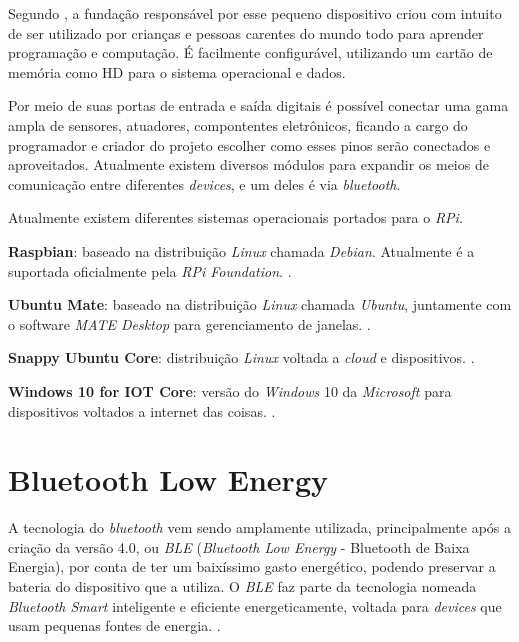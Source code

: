 \documentclass[
		12pt,				%
		openright,			%
		oneside,			%
		a4paper,			%
		chapter=TITLE,		%
		english,			%
		brazil				%
	]{abntex2}
\begin{document}
Segundo , a fundação responsável por esse pequeno dispositivo criou com intuito de ser utilizado por crianças e pessoas carentes do mundo todo para aprender programação e computação. É facilmente configurável, utilizando um cartão de memória como HD para o sistema operacional e dados.

Por meio de suas portas de entrada e saída digitais é possível conectar uma gama ampla de sensores, atuadores, compontentes eletrônicos, ficando a cargo do programador e criador do projeto escolher como esses pinos serão conectados e aproveitados. Atualmente existem diversos módulos para expandir os meios de comunicação entre diferentes \textit{devices}, e um deles é via \textit{bluetooth}.

Atualmente existem diferentes sistemas operacionais portados para o \textit{RPi}.

\begin{alineas}
	\item \textbf{Raspbian}: baseado na distribuição \textit{Linux} chamada \textit{Debian}. Atualmente é a suportada oficialmente pela \textit{RPi Foundation}. \cite{rpi-download}.
	\item \textbf{Ubuntu Mate}: baseado na distribuição \textit{Linux} chamada \textit{Ubuntu}, juntamente com o software \textit{MATE Desktop} para gerenciamento de janelas. \cite{ubuntu-mate}.
	\item \textbf{Snappy Ubuntu Core}: distribuição \textit{Linux} voltada a \textit{cloud} e dispositivos. \cite{snappy-ubuntu}.
	\item \textbf{Windows 10 for IOT Core}: versão do \textit{Windows} 10 da \textit{Microsoft} para dispositivos voltados a internet das coisas. \cite{windows10-iot}.
\end{alineas}

\section{Bluetooth Low Energy}\label{sec:ble}

A tecnologia do \textit{bluetooth} vem sendo amplamente utilizada, principalmente após a criação da versão 4.0, ou \textit{BLE} (\textit{Bluetooth Low Energy} - Bluetooth de Baixa Energia), por conta de ter um baixíssimo gasto energético, podendo preservar a bateria do dispositivo que a utiliza. O \textit{BLE} faz parte da tecnologia nomeada \textit{Bluetooth Smart} inteligente e eficiente energeticamente, voltada para \textit{devices} que usam pequenas fontes de energia. \cite{bluetooth-smart}.
\end{document}
